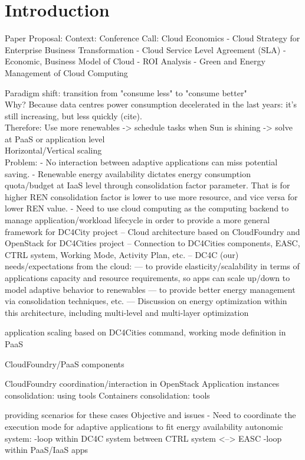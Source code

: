 \section{Introduction}
\label{sec: intro}
Paper Proposal:
Context:
  Conference Call: Cloud Economics
- Cloud Strategy for Enterprise Business Transformation
- Cloud Service Level Agreement (SLA)
- Economic, Business Model of Cloud
- ROI Analysis
- Green and Energy Management of Cloud Computing

Paradigm shift: transition from "consume less" to "consume better" \\
Why? Because data centres power consumption decelerated in the last years: it's still increasing, but less quickly (cite). \\

Therefore: Use more renewables -> schedule tasks when Sun is shining -> solve at PaaS or application level \\
Horizontal/Vertical scaling \\

Problem:
- No interaction between adaptive applications can miss potential saving.
- Renewable energy availability dictates energy consumption quota/budget at IaaS level through consolidation factor parameter. That is for higher REN consolidation factor is lower to use more resource, and vice versa for lower REN value.
- Need to use cloud computing as the computing backend to manage application/workload lifecycle in order to provide a more general framework for DC4City project
-- Cloud architecture based on CloudFoundry and OpenStack for DC4Cities project
-- Connection to DC4Cities components, EASC, CTRL system, Working Mode, Activity Plan, etc.
-- DC4C (our) needs/expectations from the cloud:
--- to provide elasticity/scalability in terms of applications capacity and resource requirements, so apps can scale up/down to model adaptive behavior to renewables
--- to provide better energy management via consolidation techniques, etc.
--- Discussion on energy optimization within this architecture, including multi-level and multi-layer optimization


application scaling based on DC4Cities command,
working mode definition in PaaS

CloudFoundry/PaaS components

CloudFoundry coordination/interaction in OpenStack
Application instances consolidation: using tools
Containers consolidation: tools


providing scenarios for these cases
Objective and issues
- Need to coordinate the execution mode for adaptive applications to fit energy availability
autonomic system:
-loop within DC4C system between CTRL system <--> EASC
-loop within PaaS/IaaS apps
		
